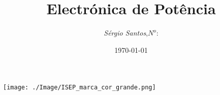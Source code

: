 \begin{titlepage}
\begin{minipage}{0.95\linewidth}
\centering
\texttt{[image: ./Image/ISEP\_marca\_cor\_grande.png]}
\label{Capa}
\title{Electr\'{o}nica de Pot\^{e}ncia}
\author{\emph{S\'{e}rgio Santos},\;$N^o$:}
\date{\today}
\maketitle
\end{minipage}
\end{titlepage}
